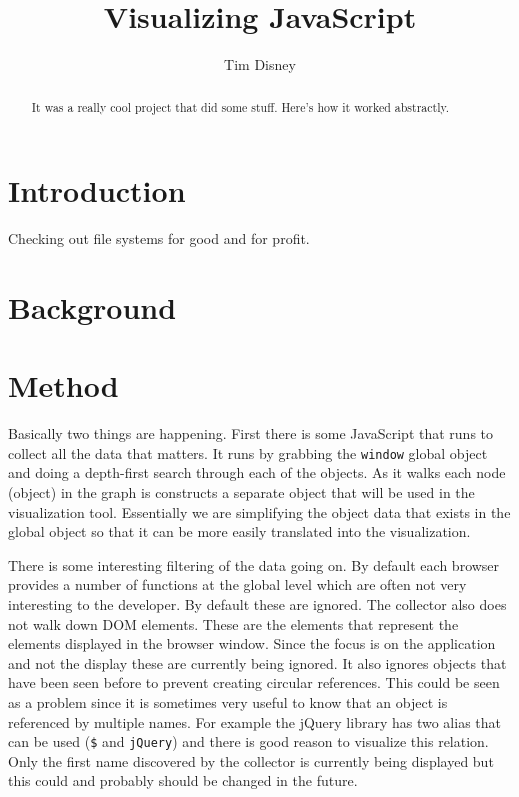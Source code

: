 \documentclass{article}
\begin{document}
\title{Visualizing JavaScript}
\author{Tim Disney}

\maketitle

\lstset{showstringspaces=false}

\begin{abstract}
It was a really cool project that did some stuff. Here's how it worked abstractly.
\end{abstract}

\section{Introduction}
Checking out file systems for good and for profit.

\section{Background}

\section{Method}
Basically two things are happening. First there is some JavaScript that runs to collect all the data that matters. It runs by grabbing the {\tt window} global object and doing a depth-first search through each of the objects. As it walks each node (object) in the graph is constructs a separate object that will be used in the visualization tool. Essentially we are simplifying the object data that exists in the global object so that it can be more easily translated into the visualization.

There is some interesting filtering of the data going on. By default each browser provides a number of functions at the global level which are often not very interesting to the developer. By default these are ignored. The collector also does not walk down DOM elements. These are the elements that represent the elements displayed in the browser window. Since the focus is on the application and not the display these are currently being ignored. It also ignores objects that have been seen before to prevent creating circular references. This could be seen as a problem since it is sometimes very useful to know that an object is referenced by multiple names. For example the jQuery library has two alias that can be used ({\tt \$} and {\tt jQuery}) and there is good reason to visualize this relation. Only the first name discovered by the collector is currently being displayed but this could and probably should be changed in the future.
\end{document}
